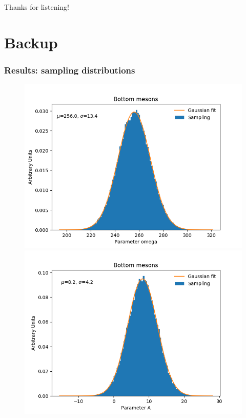 \documentclass[10pt]{beamer}
\begin{document}
\begin{frame}

Thanks for listening!

\end{frame}



\section{Backup}
\begin{frame}
\frametitle{Results: sampling distributions}

\begin{figure}
   \includegraphics[scale=0.325]{./Plots/Bottom_bootstrap_o.png}
   \includegraphics[scale=0.325]{./Plots/Bottom_bootstrap_a.png}       
\end{figure}

\end{frame}
\end{document}
